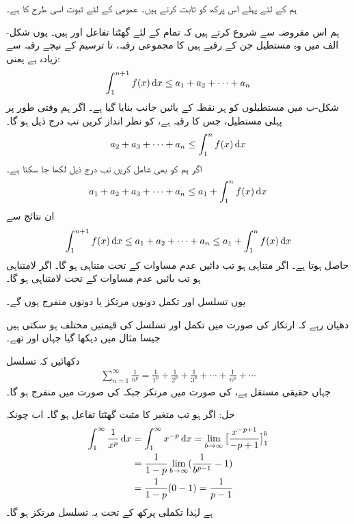 ہم  کے لئے پہلے اس پرکھ کو ثابت کرتے ہیں۔ عمومی  کے لئے ثبوت اسی طرح کا ہے۔ 

ہم اس مفروضہ سے شروع کرتے ہیں کہ تمام  کے لئے  گھٹتا تفاعل  اور  ہیں۔ یوں شکل-الف میں وہ مستطیل جن کے رقبے   ہیں کا مجموعی رقبہ،  تا  ترسیم  کے نیچے رقبہ سے زیادہ ہے یعنی:
\begin{align*}
\int_1^{n+1}f(x)\dif x\le a_1+a_2+\cdots+a_n
\end{align*} 
شکل-ب میں مستطیلوں کو ہر نقطہ کے بائیں جانب بنایا گیا ہے۔ اگر ہم وقتی طور پر پہلی مستطیل، جس کا رقبہ  ہے، کو نظر انداز کریں تب درج ذیل ہو گا۔
\begin{align*}
a_2+a_3+\cdots+a_n\le \int_1^nf(x)\dif x
\end{align*}
اگر ہم  کو بھی شامل کریں تب درج ذیل لکھا جا سکتا ہے۔
\begin{align*}
a_1+a_2+a_3+\cdots+a_n\le a_1+\int_1^nf(x)\dif x
\end{align*}
ان نتائج سے 
\begin{align}
\int_1^{n+1}f(x)\dif x\le a_1+a_2+\cdots+a_n\le  a_1+\int_1^nf(x)\dif x
\end{align}
حاصل ہوتا ہے۔ اگر  متناہی ہو تب دائیں عدم مساوات کے تحت  متناہی ہو گا۔  اگر  لامتناہی ہو تب بائیں عدم مساوات کے تحت  لامتناہی ہو گا۔ 

یوں تسلسل اور تکمل دونوں مرتکز یا دونوں منفرج ہوں گے۔

دھیان رہے کہ ارتکاز کی صورت میں تکمل اور تسلسل کی قیمتیں مختلف ہو سکتی ہیں جیسا مثال  میں دیکھا گیا جہاں  اور  تھے۔

دکھائیں کہ  تسلسل
\begin{align}
\sum_{n=1}^{\infty}\frac{1}{n^p}=\frac{1}{1^p}+\frac{1}{2^p}+\frac{1}{3^p}+\cdots+\frac{1}{n^p}+\cdots
\end{align}
جہاں  حقیقی مستقل ہے،  کی صورت میں مرتکز جبکہ  کی صورت میں منفرج ہو گا۔

حل:\quad
اگر  ہو تب  متغیر  کا مثبت گھٹتا تفاعل ہو گا۔ اب چونکہ
\begin{align*}
\int_1^{\infty}\frac{1}{x^p}\dif x&=\int_1^{\infty}x^{-p}\dif x=\lim_{b\to\infty}\big[\frac{x^{-p+1}}{-p+1}\big]_1^b\\
&=\frac{1}{1-p}\lim_{b\to\infty}(\frac{1}{b^{p-1}}-1)\\
&=\frac{1}{1-p}(0-1)=\frac{1}{p-1}
\end{align*}
ہے لہٰذا تکملی پرکھ کے تحت یہ تسلسل مرتکز ہو گا۔

